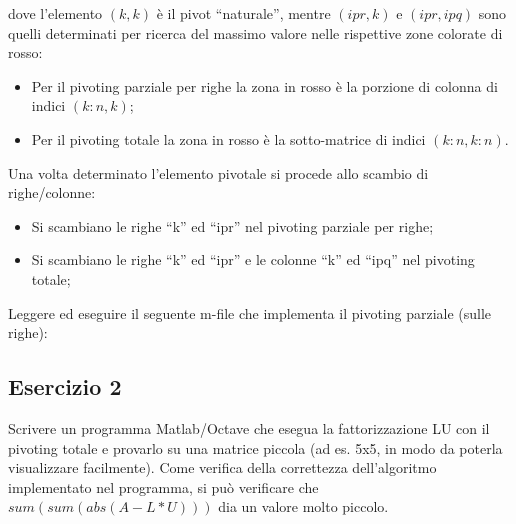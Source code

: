 dove l'elemento $(k,k)$ è il pivot ``naturale'', mentre $(ipr,k)$ e $(ipr,ipq)$ sono quelli determinati per ricerca del massimo valore nelle rispettive zone colorate di rosso:

\begin{itemize}

\item Per il pivoting parziale per righe la zona in rosso è la porzione di colonna di indici $(k:n,k)$;
\item Per il pivoting totale la zona in rosso è la sotto-matrice di indici $(k:n,k:n)$.

\end{itemize}

Una volta determinato l'elemento pivotale si procede allo scambio di righe/colonne:

\begin{itemize}

\item Si scambiano le righe ``k'' ed ``ipr'' nel pivoting parziale per righe;
\item Si scambiano le righe ``k'' ed ``ipr'' e le colonne ``k'' ed ``ipq'' nel pivoting totale;

\end{itemize}

Leggere ed eseguire il seguente m-file che implementa il pivoting parziale (sulle righe):



\subsection{Esercizio 2}  

Scrivere un programma Matlab/Octave che esegua la fattorizzazione LU con il pivoting totale e provarlo su una matrice piccola (ad es. 5x5, in modo da poterla visualizzare facilmente). Come verifica della correttezza dell'algoritmo implementato nel programma, si può verificare che $sum(sum(abs(A - L*U)))$ dia un valore molto piccolo.


